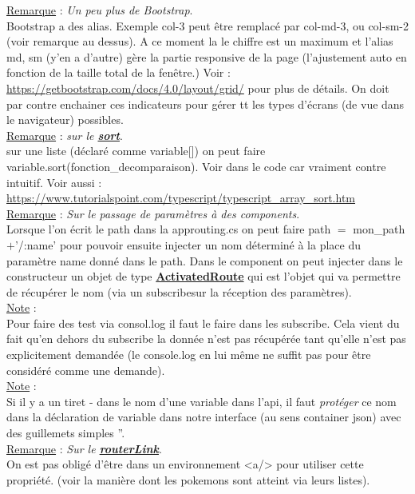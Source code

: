 \documentclass[a4paper,12pt,twoside]{article}
\newcommand{\urlcolor}{magenta}  %
\newcommand{\keycolor}{purple} %
\newcommand{\incode}[1]{{\footnotesize\ttfamily #1}} %
\newcommand{\rem}[2]{\noindent\underline{Remarque} : \textit{#1}.\\ \indent #2}
\newcommand{\note}[1]{\noindent\underline{Note} : \\ \indent #1}
\newcommand{\keyref}[2]{\hypersetup{urlcolor=\keycolor} \href{#1}{\textbf{#2}}\hypersetup{urlcolor=\urlcolor}}
\begin{document}
\rem{Un peu plus de Bootstrap}{Bootstrap a des alias. Exemple col-3 peut être remplacé par col-md-3, ou col-sm-2 (voir remarque au dessus). A ce moment la le chiffre est un maximum et l'alias md, sm (y'en a d'autre) gère la partie responsive de la page (l'ajustement auto en fonction de la taille total de la fenêtre.) Voir : \url{https://getbootstrap.com/docs/4.0/layout/grid/} pour plus de détails. On doit par contre enchainer ces indicateurs pour gérer tt les types d'écrans (de vue dans le navigateur) possibles.}\\

\rem{sur le \keyref{https://developer.mozilla.org/fr/docs/Web/JavaScript/Reference/Global_Objects/Array/sort}{sort}}{sur une liste (déclaré comme \incode{variable[]}) on peut faire \incode{variable.sort(fonction\_decomparaison)}. Voir dans le code car vraiment contre intuitif. Voir aussi : \url{https://www.tutorialspoint.com/typescript/typescript_array_sort.htm}}\\

\rem{Sur le passage de paramètres à des components}{Lorsque l'on écrit le path dans la \incode{approuting.cs} on peut faire \incode{path $=$ mon\_path$+$'/:name'} pour pouvoir ensuite injecter un nom déterminé à la place du paramètre \incode{name} donné dans le path. Dans le component on peut injecter dans le constructeur un objet de type \keyref{https://angular.io/api/router/ActivatedRoute}{ActivatedRoute} qui est l'objet qui va permettre de récupérer le nom (via un \incode{subscribe}sur la réception des paramètres). }\\

\note{Pour faire des test via \incode{consol.log} il faut le faire dans les \incode{subscribe}. Cela vient du fait qu'en dehors du \incode{subscribe} la donnée n'est pas récupérée tant qu'elle n'est pas explicitement demandée (le \incode{console.log} en lui même ne suffit pas pour être considéré comme une demande).}\\

\note{Si il y a un tiret - dans le nom d'une variable dans l'api, il faut \textit{protéger} ce nom dans la déclaration de variable dans notre interface (au sens container json) avec des guillemets simples ''.}\\

\rem{Sur le \keyref{https://angular.io/api/router/RouterLink}{routerLink}}{On est pas obligé d'être dans un environnement <a/> pour utiliser cette propriété. (voir la manière dont les pokemons sont atteint via leurs listes).}\\
\end{document}
